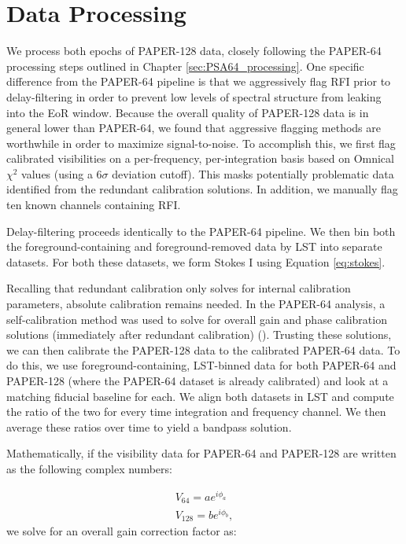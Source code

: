 \section{Data Processing}

We process both epochs of PAPER-128 data, closely following the PAPER-64 processing steps outlined in Chapter \ref{sec:PSA64_processing}. One specific difference from the PAPER-64 pipeline is that we aggressively flag RFI prior to delay-filtering in order to prevent low levels of spectral structure from leaking into the EoR window. Because the overall quality of PAPER-128 data is in general lower than PAPER-64, we found that aggressive flagging methods are worthwhile in order to maximize signal-to-noise. To accomplish this, we first flag calibrated visibilities on a per-frequency, per-integration basis based on {\sc Omnical} $\chi^{2}$ values (using a $6\sigma$ deviation cutoff). This masks potentially problematic data identified from the redundant calibration solutions. In addition, we manually flag ten known channels containing RFI. 

Delay-filtering proceeds identically to the PAPER-64 pipeline. We then bin both the foreground-containing and foreground-removed data by LST into separate datasets. For both these datasets, we form Stokes I using Equation \eqref{eq:stokes}.

Recalling that redundant calibration only solves for internal calibration parameters, absolute calibration remains needed. In the PAPER-64 analysis, a self-calibration method was used to solve for overall gain and phase calibration solutions (immediately after redundant calibration) (\citealt{ali_et_al2015}). Trusting these solutions, we can then calibrate the PAPER-128 data to the calibrated PAPER-64 data. To do this, we use foreground-containing, LST-binned data for both PAPER-64 and PAPER-128 (where the PAPER-64 dataset is already calibrated) and look at a matching fiducial baseline for each. We align both datasets in LST and compute the ratio of the two for every time integration and frequency channel. We then average these ratios over time to yield a bandpass solution. 

Mathematically, if the visibility data for PAPER-64 and PAPER-128 are written as the following complex numbers:

\begin{eqnarray}
V_{64} = ae^{i\phi_{a}} \\
V_{128} = be^{i\phi_{b}},
\end{eqnarray}
we solve for an overall gain correction factor as:

